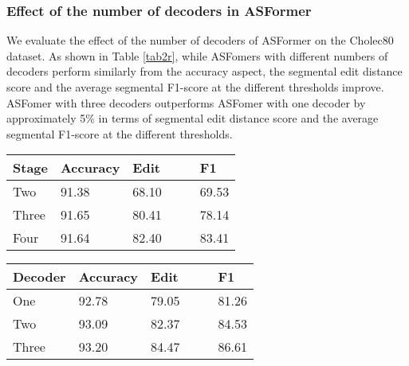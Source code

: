 \documentclass[sn-mathphys,Numbered]{sn-jnl}
\theoremstyle{thmstyleone}\newtheorem{theorem}{Theorem}\newtheorem{proposition}[theorem]{Proposition}
\theoremstyle{thmstyletwo}\newtheorem{example}{Example}\newtheorem{remark}{Remark}
\theoremstyle{thmstylethree}\newtheorem{definition}{Definition}
\begin{document}
\subsubsection{Effect of the number of decoders in ASFormer}

We evaluate the effect of the number of decoders of ASFormer on the Cholec80 dataset. As shown in Table \ref{tab2r}, while ASFomers with different numbers of decoders perform similarly from the accuracy aspect,  the segmental edit distance score and the average segmental F1-score at the different thresholds improve. ASFomer with three decoders outperforms ASFomer with one decoder by approximately 5\% in terms of segmental edit distance score and the average segmental F1-score at the different thresholds. 

\begin{minipage}[t]{0.45\textwidth}
\centering
\fontsize{8}{10}\selectfont
{}\label{tab1r}
\begin{tabular}[b]{llll}
\toprule
Stage & Accuracy & Edit & F1 \\
\midrule
Two &91.38    &68.10    &69.53 \\
Three &91.65   &80.41    &78.14 \\
Four &91.64    &82.40    &83.41 \\
\bottomrule \end{tabular}
\end{minipage}
\hfill
\begin{minipage}[t]{0.45\textwidth}
\centering
\fontsize{8}{10}\selectfont
{}\label{tab2r}
\begin{tabular}[b]{llll}
\toprule
Decoder & Accuracy & Edit & F1 \\
\midrule
One &92.78    &79.05    &81.26 \\
Two &93.09   &82.37    &84.53 \\
Three &93.20    &84.47    &86.61 \\
\bottomrule \end{tabular}
\end{minipage}
\end{document}
